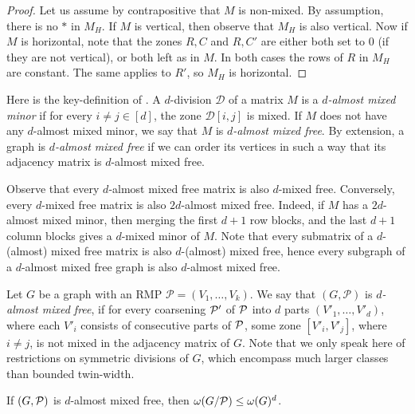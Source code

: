 \documentclass[11pt]{article}
\numberwithin{equation}{section}
\begin{document}
\begin{proof}
 Let us assume by contrapositive that $M$ is non-mixed. By assumption, there is no $*$ in  $M_H$. If $M$ is vertical, then observe that $M_H$ is also vertical. Now if $M$ is horizontal, note that the zones $R,C$ and $R,C'$ are either both set to 0 (if they are not vertical), or both left as in $M$. In both cases the rows of $R$ in $M_H$ are constant. The same applies to $R'$, so $M_H$ is horizontal. 
\end{proof}


Here is the key-definition of \cite{PS22}.   A $d$-division $\mathcal{D}$ of a matrix $M$ is a \emph{$d$-almost mixed minor} if for every $i \neq j \in [d]$, the zone $\mathcal{D}[i, j]$ is mixed. If $M$ does not have any $d$-almost mixed minor, we say that $M$ is \emph{$d$-almost mixed free}. By extension, a graph is \emph{$d$-almost mixed free} if we can order its vertices in such a way that its adjacency matrix is $d$-almost mixed free.

Observe that every $d$-almost mixed free matrix is also $d$-mixed free. Conversely, every $d$-mixed free matrix is also $2d$-almost mixed free. Indeed, if $M$ has a $2d$-almost mixed minor, then merging the first $d+1$ row blocks, and the last $d+1$ column blocks gives a $d$-mixed minor of $M$. Note that every submatrix of a $d$-(almost) mixed free matrix is also $d$-(almost) mixed free, hence every subgraph of a $d$-almost mixed free graph is also $d$-almost mixed free. 

Let $G$ be a graph with an RMP $\mathcal{P} = (V_1, \ldots, V_k)$. We say that $(G,\mathcal{P})$ is \emph{$d$-almost mixed free}, if for every coarsening $\cal P'$ of $\cal P$ into $d$ parts $(V'_1, \ldots, V'_d)$, where each $V'_i$ consists of consecutive parts of $\cal P$, some zone $[V'_i,V'_j]$, where $i\neq j$, is not mixed in the adjacency matrix of $G$. Note that we only speak here of restrictions on symmetric divisions of $G$, which encompass much larger classes than bounded twin-width. 

\begin{lemma} \label{lem:clique-quotient}
If $(G,\cal P)$ is $d$-almost mixed free, then  $\omega (G/{\cal P})\leq \omega(G)^d$.
\end{lemma} 
\end{document}
